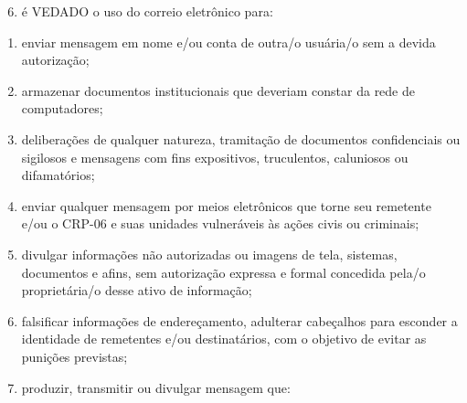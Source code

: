 \documentclass[openright, twoside, a4paper]{memoir}
\begin{document}
\begin{enumerate}

\setcounter{enumi}{5}
\item
    é VEDADO o uso do correio eletrônico para:
\end{enumerate}

\begin{enumerate}
\def\labelenumi{\roman{enumi}.}
\item
    enviar mensagem em nome e/ou conta de outra/o usuária/o sem a devida
    autorização;
\item
    armazenar documentos institucionais que deveriam constar da rede de
    computadores;
\item
    deliberações de qualquer natureza, tramitação de documentos
    confidenciais ou sigilosos e mensagens com fins expositivos,
    truculentos, caluniosos ou difamatórios;
\item
    enviar qualquer mensagem por meios eletrônicos que torne seu remetente
    e/ou o CRP-06 e suas unidades vulneráveis às ações civis ou criminais;
\item
    divulgar informações não autorizadas ou imagens de tela, sistemas,
    documentos e afins, sem autorização expressa e formal concedida pela/o
    proprietária/o desse ativo de informação;
\item
    falsificar informações de endereçamento, adulterar cabeçalhos para
    esconder a identidade de remetentes e/ou destinatários, com o objetivo
    de evitar as punições previstas;
\item
    produzir, transmitir ou divulgar mensagem que:
\end{enumerate}
\end{document}

